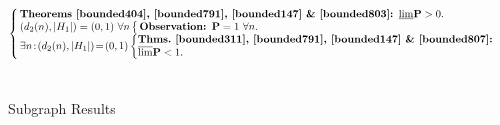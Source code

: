 \documentclass{article}
\newtheorem{Proof of Theorem}{Proof of Theorem}
\begin{document}
$\left\{ \begin{array}{l} \!\!
\textrm{\textbf{Theorems~\ref{bounded404},~\ref{bounded791},~\ref{bounded147} \&~\ref{bounded803}: }}
\underline{\lim} \mathbf{P} >0. \\
\!\!(d_{2}(n),|H_{1}|) = (0,1)~\forall n 
\left\{ \begin{array}{l} \!\!
\textrm{\textbf{Observation: }} \textbf{P}=1 \textrm{ } \forall n.
\end{array} \right. \\
\!\!\exists
\begin{picture}(0.2,1)
\put(-0.7,-0.2){\line(1,3){0.5}}
\end{picture}
n\!:\!(d_{2}(n),|H_{1}|) \!=\! (0,1) 
\left\{ \! \begin{array}{l} \!\!
\textrm{\textbf{Thms.~\ref{bounded311},~\ref{bounded791},~\ref{bounded147} \&~\ref{bounded807}: }} \\
\!\!\overline{\lim} \mathbf{P}<1. 
\end{array} \right.
\end{array} \right.$ \\
\\
\\
Subgraph Results
\end{document}
